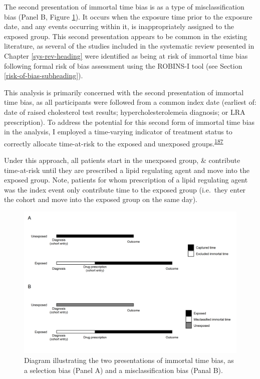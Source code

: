 \documentclass[a4paper, twoside]{templates/ociamthesis}
\begin{document}
The second presentation of immortal time bias is as a type of misclassification bias (Panel B, Figure \ref{fig:immortalTimeBias}). It occurs when the exposure time prior to the exposure date, and any events occurring within it, is inappropriately assigned to the exposed group. This second presentation appears to be common in the existing literature, as several of the studies included in the systematic review presented in Chapter \ref{sys-rev-heading} were identified as being at risk of immortal time bias following formal risk of bias assessment using the ROBINS-I tool (see Section \ref{risk-of-bias-subheading}).

This analysis is primarily concerned with the second presentation of immortal time bias, as all participants were followed from a common index date (earliest of: date of raised cholesterol test results; hypercholesterolemeia diagnosis; or LRA prescription). To address the potential for this second form of immortal time bias in the analysis, I employed a time-varying indicator of treatment status to correctly allocate time-at-risk to the exposed and unexposed groups.\textsuperscript{\protect\hyperlink{ref-levesque2010}{187}}

Under this approach, all patients start in the unexposed group, \& contribute time-at-risk until they are prescribed a lipid regulating agent and move into the exposed group. Note, patients for whom prescription of a lipid regulating agent was the index event only contribute time to the exposed group (i.e.~they enter the cohort and move into the exposed group on the same day).





\begin{figure}[H]
\includegraphics[width=1\linewidth]{figures/cprd-analysis/immortal_time} \caption[shortcap]{Diagram illustrating the two presentations of immortal time bias, as a selection bias (Panel A) and a misclassification bias (Panal B).}\label{fig:immortalTimeBias}
\end{figure}
\end{document}
